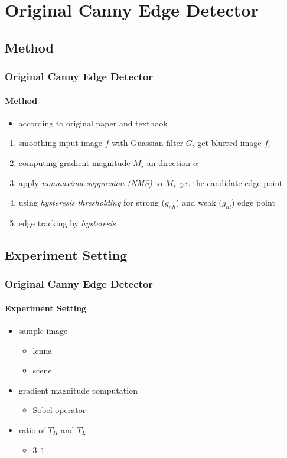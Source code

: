 \documentclass[
	11pt, %
	aspectratio=169, %
]{beamer}
\begin{document}
\section{Original Canny Edge Detector}
\subsection{Method}

\begin{frame}
	\frametitle{Original Canny Edge Detector}
	\framesubtitle{Method}

	\begin{itemize}
		\item according to original paper \cite{4767851} and textbook
	\end{itemize}
	\begin{enumerate}
		\item smoothing input image $f$ with Guassian filter $G$, get blurred image $f_s$
		\item computing gradient magnitude $M_s$ an direction $\alpha$
		\item apply \emph{nonmaxima suppresion (NMS)} to $M_s$ get the candidate edge point
		\item using \emph{hysteresis thresholding} for strong ($g_{nh}$) and weak ($g_{nl}$) edge point
		\item edge tracking by \emph{hysteresis}
	\end{enumerate}
\end{frame}

\subsection{Experiment Setting}

\begin{frame}
	\frametitle{Original Canny Edge Detector}
	\framesubtitle{Experiment Setting}

	\begin{itemize}
		\item sample image
		\begin{itemize}
			\item lenna
			\item scene
		\end{itemize}
		\item gradient magnitude computation
		\begin{itemize}
			\item Sobel operator
		\end{itemize}
		\item ratio of $T_H$ and $T_L$
		\begin{itemize}
			\item $3:1$
		\end{itemize}
	\end{itemize}

\end{frame}
\end{document}
